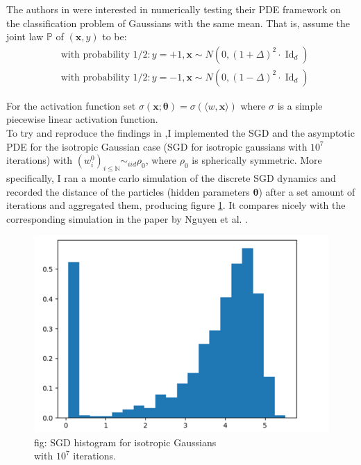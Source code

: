 \documentclass{article}
\theoremstyle{mystyle}
\newcommand{\N}{\ensuremath{\mathbb{N}}}
\newcommand{\PP}{\ensuremath{\mathbb{P}}}
\DeclareMathOperator{\Id}{Id}
\newcommand{\bracket}[2]{\langle #1, #2\rangle}
\begin{document}
The authors in \cite{Mei_2018} were interested in numerically testing their PDE framework on the classification problem of Gaussians with the same mean. That is, assume the joint law $ \PP$ of $(\mathbf{x}, y) $ to be:
\begin{equation}
\begin{array}{cc}
& \text{with probability }  1/2: y = +1, \mathbf{x}\sim N(0, (1+\Delta)^{2}\cdot\Id_{d})\\
& \text{with probability } 1/2: y = -1, \mathbf{x}\sim N(0, (1-\Delta)^{2}\cdot\Id_{d})
\end{array}
\end{equation}

For the activation function set $ \sigma( \mathbf{x}; \mathbf{\theta}) = \sigma(\bracket{w}{ \mathbf{x}})$ where $ \sigma$ is a simple piecewise linear activation function.\\

To try and reproduce the findings in \cite{Mei_2018},I implemented the SGD and the asymptotic PDE for the isotropic Gaussian case (SGD for isotropic gaussians with $10^7$ iterations) with $(w_i^0 )_{i\leq\N} \sim_{iid} \rho_0$, where $\rho_0$ is spherically symmetric. More specifically, I ran a monte carlo simulation of the discrete SGD dynamics and recorded the distance of the particles (hidden parameters $ \mathbf{\theta}$) after a set amount of iterations and aggregated them, producing figure \ref{fig: SGD histogram isotropic Gaussians}. It compares nicely with the corresponding simulation in the paper  by Nguyen et al. \cite{Mei_2018}. 

\begin{figure}[H]
\centering
  \includegraphics[width=0.6\linewidth]{ images/Nguyen2018-SGD-1.png}
  \caption{fig: SGD histogram for isotropic Gaussians\\ with $ 10^{7}$ iterations.}
  \label{fig: SGD histogram isotropic Gaussians}
\end{figure}
\end{document}
